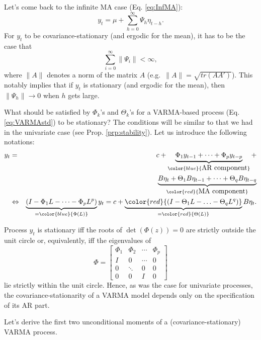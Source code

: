 \documentclass[
  12pt,
]{book}
\theoremstyle{definition}
\theoremstyle{definition}
\theoremstyle{definition}
\theoremstyle{definition}
\theoremstyle{remark}
\begin{document}
Let's come back to the infinite MA case (Eq. \eqref{eq:InfMA}):
\[
y_t = \mu + \sum_{h=0}^\infty \Psi_{h} \eta_{t-h}.
\]
For \(y_t\) to be covariance-stationary (and ergodic for the mean), it has to be the case that
\begin{equation}
\sum_{i=0}^\infty \|\Psi_i\| < \infty,\label{eq:condiInfiniteMA}
\end{equation}
where \(\|A\|\) denotes a norm of the matrix \(A\) (e.g.~\(\|A\|=\sqrt{tr(AA')}\)). This notably implies that if \(y_t\) is stationary (and ergodic for the mean), then \(\|\Psi_h\|\rightarrow 0\) when \(h\) gets large.

What should be satisfied by \(\Phi_k\)'s and \(\Theta_k\)'s for a VARMA-based process (Eq. \eqref{eq:VARMAstd}) to be stationary? The conditions will be similar to that we had in the univariate case (see Prop. \ref{prp:stability}). Let us introduce the following notations:
\begin{eqnarray}
y_t &=& c + \underbrace{\Phi_1 y_{t-1} + \dots +\Phi_p y_{t-p}}_{\color{blue}{\mbox{AR component}}} +  \label{eq:VARMA2}\\
&&\underbrace{B \eta_t+ \Theta_1 B \eta_{t-1}+ \dots+ \Theta_q B \eta_{t-q}}_{\color{red}{\mbox{MA component}}} \nonumber\\
&\Leftrightarrow& \underbrace{(I - \Phi_1 L - \dots - \Phi_p L^p)}_{= \color{blue}{\Phi(L)}}y_t = c +  \underbrace{ \color{red}{(I - \Theta_1 L - \ldots - \Theta_q L^q)}}_{=\color{red}{\Theta(L)}} B \eta_{t}. \nonumber
\end{eqnarray}

Process \(y_t\) is stationary iff the roots of \(\det(\Phi(z))=0\) are strictly outside the unit circle or, equivalently, iff the eigenvalues of
\begin{equation}
\Phi = \left[\begin{array}{cccc}
\Phi_{1} & \Phi_{2} & \cdots & \Phi_{p}\\
I & 0 & \cdots & 0\\
0 & \ddots & 0 & 0\\
0 & 0 & I & 0\end{array}\right]\label{eq:matrixPHI}
\end{equation}
lie strictly within the unit circle. Hence, as was the case for univariate processes, the covariance-stationarity of a VARMA model depends only on the specification of its AR part.

Let's derive the first two unconditional moments of a (covariance-stationary) VARMA process.
\end{document}
